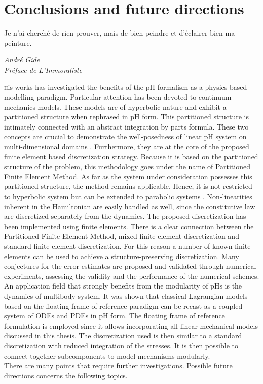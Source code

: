 \chapter*{Conclusions and future directions}

\epigraph{Je n’ai cherché de rien prouver, mais de bien peindre et d’éclairer bien ma peinture.}{\textit{André Gide \\ Préface de L'Immoraliste}}

\lettrine{\color{theme}{T}}his works has investigated the benefits of the pH formalism as a physics based modelling paradigm. Particular attention has been devoted to continuum mechanics models. These models are of hyperbolic nature and exhibit a partitioned structure when rephrased in  pH form. This partitioned structure is intimately connected with an abstract integration by parts formula. These two concepts are crucial to demonstrate the well-posedness of linear pH system on multi-dimensional domains \cite{skrepek2019wellposedness}. Furthermore, they are at the core of the proposed finite element based discretization strategy. Because it is based on the partitioned structure of the problem, this methodology goes under the name of Partitioned Finite Element Method. As far as the system under consideration possesses this partitioned structure, the method remains applicable. Hence, it is not restricted to  hyperbolic system but can be extended to parabolic systems \cite{serhani2019discretization}. Non-linearities inherent in the Hamiltonian are easily handled as well, since the constitutive law are discretized separately from the dynamics. The proposed discretization has been implemented using finite elements. There is a clear connection between the Partitioned Finite Element Method, mixed finite element discretization and standard finite element discretization. For this reason a number of known finite elements can be used to achieve a structure-preserving discretization. Many conjectures for the error estimates are proposed and validated through numerical experiments, assessing the validity and the performance of the numerical schemes. An application field that strongly benefits from the modularity of pHs is the dynamics of multibody system. It was shown that classical Lagrangian models based on the floating frame of reference paradigm can be recast as a coupled system of ODEs and PDEs in pH form. The floating frame of reference formulation is employed since it allows incorporating all linear mechanical models discussed in this thesis. The discretization used is then similar to a standard discretization with reduced integration of the stresses. It is then possible to connect together subcomponents to model mechanisms modularly. \\ There are many points that require further investigations. Possible future directions concerns the following topics.


